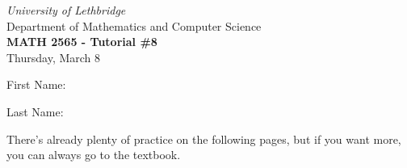 \documentclass[12pt]{article}
\newcommand{\skipline}{\vspace{12pt}}
\begin{document}
\author{Instructor: Sean Fitzpatrick}
\thispagestyle{empty}
\begin{center}
\emph{University of Lethbridge}\\
Department of Mathematics and Computer Science\\
{\bf MATH 2565 - Tutorial \#8}\\
Thursday, March 8
\end{center}
\skipline \skipline \skipline \noindent \skipline

\skipline
First Name:\underline{\hspace{348pt}}\\
\skipline

\vspace{1cm}

Last Name:\underline{\hspace{351pt}}



\vspace*{\fill}

There's already plenty of practice on the following pages, but if you want more, you can always go to the textbook.





\newpage
\end{document}
